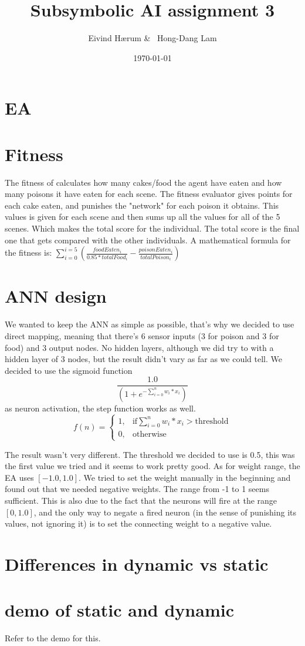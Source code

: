 \documentclass[12pt, a4paper]{article}
\title{Subsymbolic AI assignment 3}
\author{Eivind Hærum \& \ Hong-Dang Lam}
\date{\today} %
\begin{document}
\maketitle
% 
% 
\newpage

\tableofcontents
{}
\newpage

\section{EA}

\section{Fitness}
The fitness of calculates how many cakes/food the agent have eaten and how many poisons it have eaten for each scene. The fitness evaluator gives points for each cake eaten, and punishes the "network" for each poison it obtains. This values is given for each scene and then sums up all the values for all of the 5 scenes. Which makes the total score for the individual. The total score is the final one that gets compared with the other individuals.
A mathematical formula for the fitness is:
$ \sum_{i=0}^{i =5}({\frac{foodEaten_i}{0.85 * totalFood_i} - \frac{poisonEaten_i}{totalPoison_i}}) $

\section{ANN design}
We wanted to keep the ANN as simple as possible, that's why we decided to use direct mapping, meaning that there's 6 sensor inputs (3 for poison and 3 for food) and 3 output nodes. No hidden layers, although we did try to with a hidden layer of 3 nodes, but the result didn't vary as far as we could tell.
We decided to use the sigmoid function $$ \frac{1.0}
{(1+e^ {-\sum_{i = 0}^{n}{w_i * x_i}})} $$as neuron activation, the step function works as well.  $$
f(n) =
\begin{cases}
1, & \text{if} \sum_{i = 0}^{n}{w_i * x_i}>\text{threshold} \\
0, & \text{otherwise }
\end{cases}
$$

The result wasn't very different.
The threshold we decided to use is 0.5, this was the first value we tried and it seems to work pretty good. As for weight range, the EA uses $[-1.0, 1.0]$. We tried to set the weight manually in the beginning and found out that we needed negative weights. The range from -1 to 1 seems sufficient. This is also due to the fact that the neurons will fire at the range $[0,1.0]$, and the only way to negate a fired neuron (in the sense of punishing its values, not ignoring it) is to set the connecting weight to a negative value.

\section{Differences in dynamic vs static}

\section{demo of static and dynamic}
Refer to the demo for this.
\end{document}
